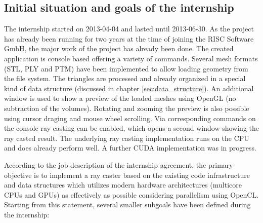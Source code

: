 \subsection{Initial situation and goals of the internship}
\label{sec:goals}

The internship started on 2013-04-04 and lasted until 2013-06-30. As the project has already been running for two years at the time of joining the RISC Software GmbH, the major work of the project has already been done. The created application is console based offering a variety of commands. Several mesh formats (STL, PLY and PTM) have been implemented to allow loading geometry from the file system. The triangles are processed and already organized in a special kind of data structure (discussed in chapter \ref{sec:data_structure}). An additional window is used to show a preview of the loaded meshes using OpenGL (no subtraction of the volumes). Rotating and zooming the preview is also possible using cursor draging and mouse wheel scrolling. Via corresponding commands on the console ray casting can be enabled, which opens a second window showing the ray casted result. The underlying ray casting implementation runs on the CPU and does already perform well. A further CUDA implementation was in progress.

According to the job description of the internship agreement, the primary objective is to implement a ray caster based on the existing code infrastructure and data structures which utilizes modern hardware architectures (multicore CPUs and GPUs) as effectively as possible considering parallelism using OpenCL. Starting from this statement, several smaller subgoals have been defined during the internship:

